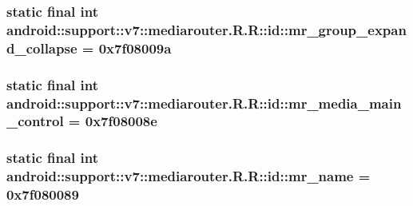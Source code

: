 \hypertarget{classandroid_1_1support_1_1v7_1_1mediarouter_1_1_r_1_1id_469b935593275e6582a82cbe39c62654}{
\subsubsection[{mr\_\-group\_\-expand\_\-collapse}]{\setlength{\rightskip}{0pt plus 5cm}static final int android::support::v7::mediarouter.R.R::id::mr\_\-group\_\-expand\_\-collapse = 0x7f08009a}}
\label{classandroid_1_1support_1_1v7_1_1mediarouter_1_1_r_1_1id_469b935593275e6582a82cbe39c62654}


\hypertarget{classandroid_1_1support_1_1v7_1_1mediarouter_1_1_r_1_1id_38a2f9458fe28622a6df166b47bf3bbd}{
\subsubsection[{mr\_\-media\_\-main\_\-control}]{\setlength{\rightskip}{0pt plus 5cm}static final int android::support::v7::mediarouter.R.R::id::mr\_\-media\_\-main\_\-control = 0x7f08008e}}
\label{classandroid_1_1support_1_1v7_1_1mediarouter_1_1_r_1_1id_38a2f9458fe28622a6df166b47bf3bbd}


\hypertarget{classandroid_1_1support_1_1v7_1_1mediarouter_1_1_r_1_1id_f41176ce63d85c42b9e0396125714f3b}{
\subsubsection[{mr\_\-name}]{\setlength{\rightskip}{0pt plus 5cm}static final int android::support::v7::mediarouter.R.R::id::mr\_\-name = 0x7f080089}}
\label{classandroid_1_1support_1_1v7_1_1mediarouter_1_1_r_1_1id_f41176ce63d85c42b9e0396125714f3b}


